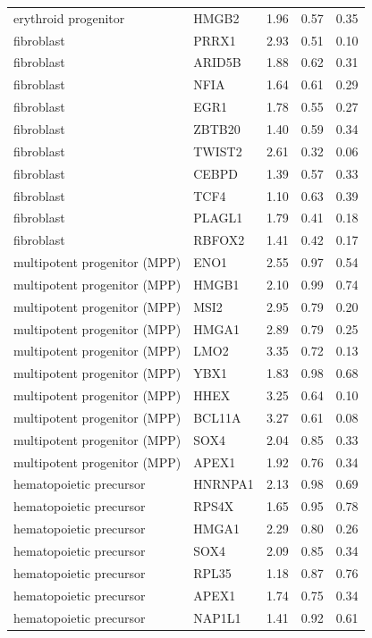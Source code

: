 \begin{longtable}{llccc}
erythroid progenitor & HMGB2 & 1.96 & 0.57 & 0.35 \\
fibroblast & PRRX1 & 2.93 & 0.51 & 0.10 \\
fibroblast & ARID5B & 1.88 & 0.62 & 0.31 \\
fibroblast & NFIA & 1.64 & 0.61 & 0.29 \\
fibroblast & EGR1 & 1.78 & 0.55 & 0.27 \\
fibroblast & ZBTB20 & 1.40 & 0.59 & 0.34 \\
fibroblast & TWIST2 & 2.61 & 0.32 & 0.06 \\
fibroblast & CEBPD & 1.39 & 0.57 & 0.33 \\
fibroblast & TCF4 & 1.10 & 0.63 & 0.39 \\
fibroblast & PLAGL1 & 1.79 & 0.41 & 0.18 \\
fibroblast & RBFOX2 & 1.41 & 0.42 & 0.17 \\
multipotent progenitor (MPP) & ENO1 & 2.55 & 0.97 & 0.54 \\
multipotent progenitor (MPP) & HMGB1 & 2.10 & 0.99 & 0.74 \\
multipotent progenitor (MPP) & MSI2 & 2.95 & 0.79 & 0.20 \\
multipotent progenitor (MPP) & HMGA1 & 2.89 & 0.79 & 0.25 \\
multipotent progenitor (MPP) & LMO2 & 3.35 & 0.72 & 0.13 \\
multipotent progenitor (MPP) & YBX1 & 1.83 & 0.98 & 0.68 \\
multipotent progenitor (MPP) & HHEX & 3.25 & 0.64 & 0.10 \\
multipotent progenitor (MPP) & BCL11A & 3.27 & 0.61 & 0.08 \\
multipotent progenitor (MPP) & SOX4 & 2.04 & 0.85 & 0.33 \\
multipotent progenitor (MPP) & APEX1 & 1.92 & 0.76 & 0.34 \\
hematopoietic precursor & HNRNPA1 & 2.13 & 0.98 & 0.69 \\
hematopoietic precursor & RPS4X & 1.65 & 0.95 & 0.78 \\
hematopoietic precursor & HMGA1 & 2.29 & 0.80 & 0.26 \\
hematopoietic precursor & SOX4 & 2.09 & 0.85 & 0.34 \\
hematopoietic precursor & RPL35 & 1.18 & 0.87 & 0.76 \\
hematopoietic precursor & APEX1 & 1.74 & 0.75 & 0.34 \\
hematopoietic precursor & NAP1L1 & 1.41 & 0.92 & 0.61 \\

\end{longtable}
